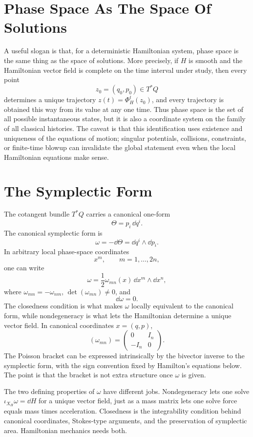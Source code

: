\section{Phase Space As The Space Of Solutions}
\label{sec:phase-space-solutions}

A useful slogan is that, for a deterministic Hamiltonian system, phase space is
the same thing as the space of solutions.
More precisely, if \(H\) is smooth and the Hamiltonian vector field is complete
on the time interval under study, then every point
\[
  z_0=(q_0,p_0)\in T^*Q
\]
determines a unique trajectory \(z(t)=\Phi^t_H(z_0)\), and every trajectory is
obtained this way from its value at any one time. Thus phase space is the set
of all possible instantaneous states, but it is also a coordinate system on the
family of all classical histories. The caveat is that this identification uses
existence and uniqueness of the equations of motion; singular potentials,
collisions, constraints, or finite-time blowup can invalidate the global
statement even when the local Hamiltonian equations make sense.

\section{The Symplectic Form}
\label{sec:symplectic-form}

The cotangent bundle \(T^*Q\) carries a canonical one-form
\[
  \Theta=p_i\,\dd q^i.
\]
The canonical symplectic form is
\[
  \omega=-\dd\Theta=\dd q^i\wedge\dd p_i.
\]
In arbitrary local phase-space coordinates
\[
  x^m,\qquad m=1,\ldots,2n,
\]
one can write
\[
  \omega=\frac12\omega_{mn}(x)\,\dd x^m\wedge\dd x^n,
\]
where \(\omega_{mn}=-\omega_{nm}\), \(\det(\omega_{mn})\neq0\), and
\[
  \dd\omega=0.
\]
The closedness condition is what makes \(\omega\) locally equivalent to the
canonical form, while nondegeneracy is what lets the Hamiltonian determine a
unique vector field. In canonical coordinates \(x=(q,p)\),
\[
  (\omega_{mn})=
  \begin{pmatrix}
  0 & I_n\\
  -I_n & 0
  \end{pmatrix}.
\]
The Poisson bracket can be expressed intrinsically by the bivector inverse to
the symplectic form, with the sign convention fixed by Hamilton's equations
below. The point is that the bracket is not extra structure once \(\omega\) is
given.

The two defining properties of \(\omega\) have different jobs. Nondegeneracy
lets one solve \(\iota_{X_H}\omega=\dd H\) for a unique vector field, just as a
mass matrix lets one solve force equals mass times acceleration. Closedness is
the integrability condition behind canonical coordinates, Stokes-type
arguments, and the preservation of symplectic area. Hamiltonian mechanics needs
both.

